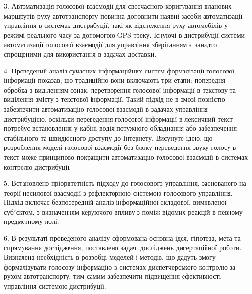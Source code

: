 3. Автоматизація голосової взаємодії для своєчасного коригування планових маршрутів руху автотранспорту повинна доповнити наявні засоби автоматизації управління в системах дистрибуції, такі як відстеження руху автомобілів у режимі реального часу за допомогою GPS треку. Існуючі в дистрибуції системи автоматизації голосової взаємодії для управління зберіганням є занадто спрощеними для використання в задачах доставки.

4. Проведений аналіз сучасних інформаційних систем формалізації голосової інформації показав, що традиційно вони включають три етапи: попередня обробка з виділенням ознак, перетворення голосової інформації в текстову та виділення змісту з текстової інформації. Такий підхід не в змозі повністю забезпечити автоматизацію голосової взаємодії в задачах управління дистрибуцією, оскільки переведення голосової інформації в лексичний текст потребує встановлення у кабіні водія потужного обладнання або забезпечення стабільного та швидкісного доступу до Інтернету. Висунуто ідею, що розроблення моделі голосової взаємодії без блоку переведення звуку голосу в текст може принципово покращити автоматизацію голосової взаємодії в системах контролю дистрибуції.

5. Встановлено пріоритетність підходу до голосового управління, заснованого на теорії несилової взаємодії з рефлекторною системою голосового управління. Підхід включає безпосередній аналіз інформаційної складової, вимовленої субʼєктом, з визначенням керуючого впливу з поміж відомих реакцій в певному предметному полі.

6. В результаті проведеного аналізу сформована основна ідея, гіпотеза, мета та спрямування дослідження, поставлено задачі досліджень дисертаційної роботи. Визначена необхідність в розробці моделей і методів, що дадуть змогу формалізувати голосову інформацію в системах диспетчерського контролю за рухом автотранспорту, тим самим забезпечити підвищення ефективності управління системою дистрибуції.

